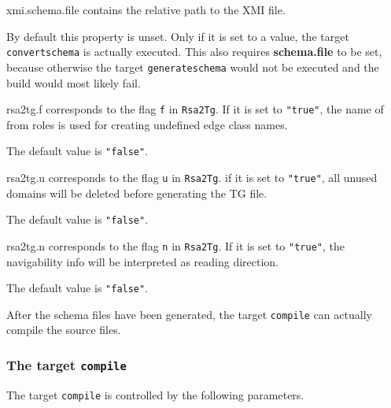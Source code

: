 \documentclass[a4paper,twoside,11pt,bibtotoc]{article}
\begin{document}
\begin{description*}
	\item[xmi.schema.file] contains the relative path to the XMI file.\par By default this property is unset. Only if it is set to a value, the target \texttt{convertschema} is actually executed. This also requires \textbf{schema.file} to be set, because otherwise the target \texttt{generateschema} would not be executed and the build would most likely fail.
	\item[rsa2tg.f] corresponds to the flag \texttt{f} in \texttt{Rsa2Tg}. If it is set to \texttt{"true"}, the name of from roles is used for creating undefined edge class names.\par The default value is \texttt{"false"}.
	\item[rsa2tg.u] corresponds to the flag \texttt{u} in \texttt{Rsa2Tg}. if it is set to \texttt{"true"}, all unused domains will be deleted before generating the TG file.\par The default value is \texttt{"false"}.
	\item[rsa2tg.n] corresponds to the flag \texttt{n} in \texttt{Rsa2Tg}. If it is set to \texttt{"true"}, the navigability info will be interpreted as reading direction.\par The default value is \texttt{"false"}.
\end{description*}


After the schema files have been generated, the target \texttt{compile} can actually compile the source files.
\subsubsection{The target \texttt{compile}}
\label{sec:compile}
The target \texttt{compile} is controlled by the following parameters.
\end{document}
